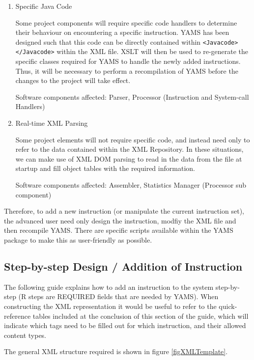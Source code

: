 \begin{enumerate}

\item Specific Java Code

Some project components will require specific code handlers to determine their behaviour on encountering a specific instruction. YAMS has been designed such that this code can be directly contained within \verb"<Javacode></Javacode>" within the XML file. XSLT will then be used to re-generate the specific classes required for YAMS to handle the newly added instructions. Thus, it will be necessary to perform a recompilation of YAMS before the changes to the project will take effect.

Software components affected: Parser, Processor (Instruction and System-call Handlers)

\item Real-time XML Parsing

Some project elements will not require specific code, and instead need only to refer to the data contained within the XML Repository. In these situations, we can make use of XML DOM parsing to read in the data from the file at startup and fill object tables with the required information.

Software components affected:	Assembler, Statistics Manager (Processor sub component)

\end{enumerate}


Therefore, to add a new instruction (or manipulate the current instruction set), the advanced user need only design the instruction, modfiy the XML file and then recompile YAMS. There are specific scripts available within the YAMS package to make this as user-friendly as possible.

\subsection{Step-by-step Design / Addition of Instruction}

The following guide  explains how to add an instruction to the system step-by-step (R steps are REQUIRED fields that are needed by YAMS). When constructing the XML representation it would be useful to refer to the quick-reference tables included at the conclusion of this section of the guide, which will indicate which tags need to be filled out for which instruction, and their allowed content types.

The general XML structure required is shown in figure \ref{figXMLTemplate}.

